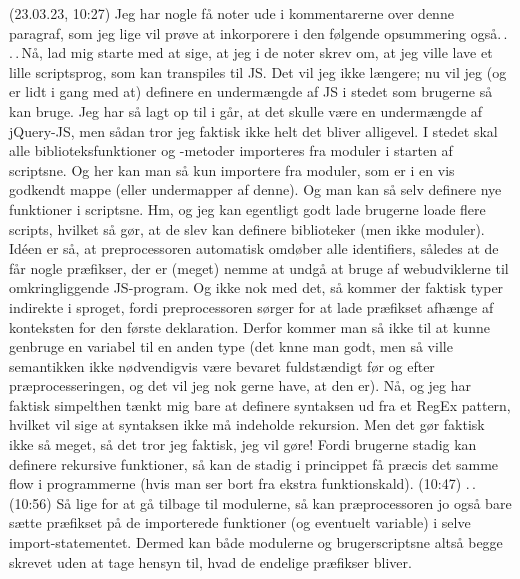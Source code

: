 \documentclass{report}
\begin{document}
(23.03.23, 10:27) Jeg har nogle få noter ude i kommentarerne over denne paragraf, som jeg lige vil prøve at inkorporere i den følgende opsummering også.\,. .\,.\,Nå, lad mig starte med at sige, at jeg i de noter skrev om, at jeg ville lave et lille scriptsprog, som kan transpiles til JS. Det vil jeg ikke længere; nu vil jeg (og er lidt i gang med at) definere en undermængde af JS i stedet som brugerne så kan bruge. Jeg har så lagt op til i går, at det skulle være en undermængde af jQuery-JS, men sådan tror jeg faktisk ikke helt det bliver alligevel. I stedet skal alle biblioteksfunktioner og -metoder importeres fra moduler i starten af scriptsne. Og her kan man så kun importere fra moduler, som er i en vis godkendt mappe (eller undermapper af denne). Og man kan så selv definere nye funktioner i scriptsne. Hm, og jeg kan egentligt godt lade brugerne loade flere scripts, hvilket så gør, at de slev kan definere biblioteker (men ikke moduler). Idéen er så, at preprocessoren automatisk omdøber alle identifiers, således at de får nogle præfikser, der er (meget) nemme at undgå at bruge af webudviklerne til omkringliggende JS-program. Og ikke nok med det, så kommer der faktisk typer indirekte i sproget, fordi preprocessoren sørger for at lade præfikset afhænge af konteksten for den første deklaration. Derfor kommer man så ikke til at kunne genbruge en variabel til en anden type (det knne man godt, men så ville semantikken ikke nødvendigvis være bevaret fuldstændigt før og efter præprocesseringen, og det vil jeg nok gerne have, at den er). Nå, og jeg har faktisk simpelthen tænkt mig bare at definere syntaksen ud fra et RegEx pattern, hvilket vil sige at syntaksen ikke må indeholde rekursion. Men det gør faktisk ikke så meget, så det tror jeg faktisk, jeg vil gøre! Fordi brugerne stadig kan definere rekursive funktioner, så kan de stadig i princippet få præcis det samme flow i programmerne (hvis man ser bort fra ekstra funktionskald). (10:47) %
.\,.\,(10:56) Så lige for at gå tilbage til modulerne, så kan præprocessoren jo også bare sætte præfikset på de importerede funktioner (og eventuelt variable) i selve import-statementet. Dermed kan både modulerne og brugerscriptsne altså begge skrevet uden at tage hensyn til, hvad de endelige præfikser bliver. 
\end{document}
